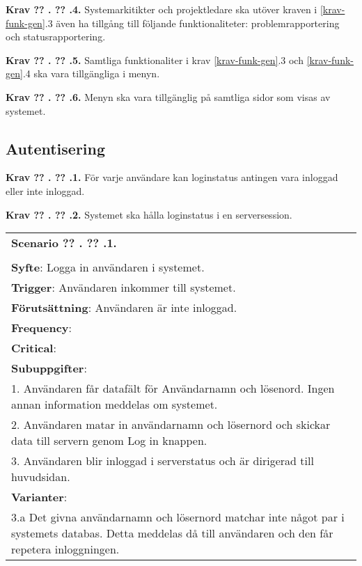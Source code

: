 \documentclass[a4paper]{article}
\newcommand\getcurrentref[1]{%
 \ifnumequal{\value{#1}}{0}
  {??}
  {\the\value{#1}}%
}
\newcommand\requirement[2]{
	\numberedrow{Krav}{#1}{#2}
}
\newcommand\scenario[2] {
	\numberedrow{Scenario}{#1}{#2}
}
\newcommand\numberedrow[3]{
	\noindent
	\textbf{#1 \getcurrentref{section}.\getcurrentref{subsection}.#2.} #3
	
}
\begin{document}
\requirement{4}{Systemarkitikter och projektledare ska utöver kraven i \ref{krav-funk-gen}.3 även ha tillgång till följande funktionaliteter: problemrapportering och statusrapportering.}
\requirement{5}{Samtliga funktionaliter i krav \ref{krav-funk-gen}.3 och \ref{krav-funk-gen}.4 ska vara tillgängliga i menyn.}
\requirement{6}{Menyn ska vara tillgänglig på samtliga sidor som visas av systemet. }
 
\subsection{Autentisering}
\requirement{1}{För varje användare kan loginstatus antingen vara inloggad eller inte inloggad.}
\requirement{2}{Systemet ska hålla loginstatus i en serversession.}


\begin{table}[htbp]
\begin{tabular}{   |p{13cm}| }
   
        \hline

    \indent\scenario{1} \\ \\
    \textbf{Syfte}: Logga in användaren i systemet.\\
    \textbf{Trigger}: Användaren inkommer till systemet. \\
    \textbf{Förutsättning}: Användaren är inte inloggad.\\
    \textbf{Frequency}: \\
    \textbf{Critical}: \\
    \hline



	\textbf{Subuppgifter}: \\

	1. Användaren får datafält för Användarnamn och lösenord. Ingen annan information meddelas om systemet.\\
	2. Användaren matar in användarnamn och lösernord och skickar data till servern genom Log in knappen. \\	
	3. Användaren blir inloggad i serverstatus och är dirigerad till huvudsidan. \\ \hline
    \textbf{Varianter}: \\
	3.a Det givna användarnamn och lösernord matchar inte något par i systemets databas. Detta meddelas då till användaren och den får repetera inloggningen.\\
	    \hline


\end{tabular}
\end{table}
\end{document}
